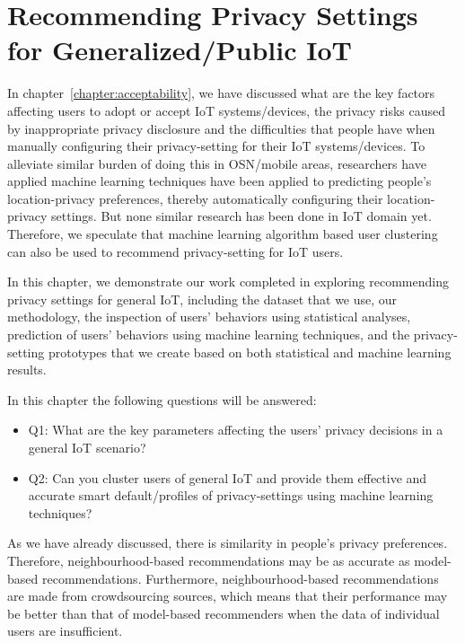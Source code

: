 \chapter{Recommending Privacy Settings for Generalized/Public IoT}\label{chapter:generalIoT}

In chapter~\ref{chapter:acceptability}, we have discussed what are the key factors affecting users to adopt or accept IoT systems/devices, the privacy risks caused by inappropriate privacy disclosure and the difficulties that people have when manually configuring their privacy-setting for their IoT systems/devices. To alleviate similar burden of doing this in OSN/mobile areas, researchers have applied machine learning techniques have been applied to predicting people’s location-privacy preferences, thereby automatically configuring their location-privacy settings. But none similar research has been done in IoT domain yet. Therefore, we speculate that machine learning algorithm based user clustering can also be used to recommend privacy-setting for IoT users.

In this chapter, we demonstrate our work completed in exploring recommending privacy settings for general IoT, including the dataset that we use, our methodology, the inspection of users' behaviors using statistical analyses, prediction of users' behaviors using machine learning techniques, and the privacy-setting prototypes that we create based on both statistical and machine learning results.

In this chapter the following questions will be answered:
\begin{itemize}
	\item Q1: What are the key parameters affecting the users' privacy decisions in a general IoT scenario?
	\item Q2: Can you cluster users of general IoT and provide them effective and accurate smart default/profiles of privacy-settings using machine learning techniques?
\end{itemize}

As we have already discussed, there is similarity in people’s privacy preferences. Therefore,
neighbourhood-based recommendations may be as accurate as model-based recommendations.
Furthermore, neighbourhood-based recommendations are made from crowdsourcing sources,
which means that their performance may be better than that of model-based recommenders when
the data of individual users are insufficient.


